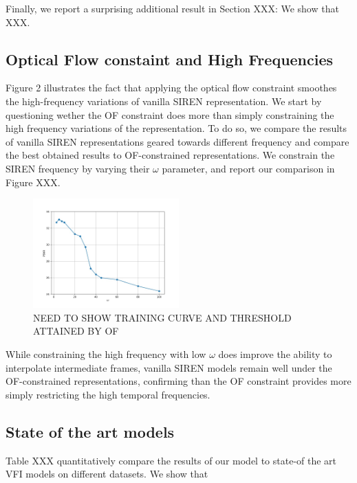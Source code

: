 \documentclass{article}
\begin{document}
Finally, we report a surprising additional result in Section XXX:
We show that XXX.

\subsection{Optical Flow constaint and High Frequencies}

Figure 2 illustrates the fact that applying the optical flow constraint smoothes the high-frequency variations of vanilla SIREN representation.
We start by questioning wether the OF constraint does more than simply constraining the high frequency variations of the representation. 
To do so, we compare the results of vanilla SIREN representations geared towards different frequency and compare the 
best obtained results to OF-constrained representations.
We constrain the SIREN frequency by varying their $\omega$ parameter, and report our comparison in Figure XXX.

\begin{figure}[t]
\centering
\includegraphics[width=0.5\textwidth]{"omega_wo_of"}
\caption{NEED TO SHOW TRAINING CURVE AND THRESHOLD ATTAINED BY OF}
\end{figure}

While constraining the high frequency with low $\omega$ does improve the ability to interpolate intermediate frames,
vanilla SIREN models remain well under the OF-constrained representations, 
confirming than the OF constraint provides more simply restricting the high temporal frequencies.

\subsection{State of the art models}

Table XXX quantitatively compare the results of our model to state-of the art VFI models on different datasets. 
We show that 
\end{document}
